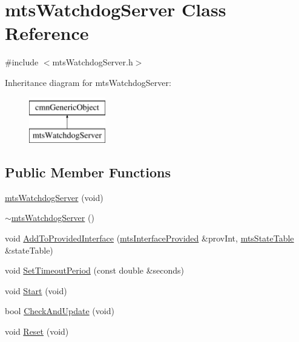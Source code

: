 \hypertarget{classmts_watchdog_server}{}\section{mts\+Watchdog\+Server Class Reference}
\label{classmts_watchdog_server}


{\ttfamily \#include $<$mts\+Watchdog\+Server.\+h$>$}

Inheritance diagram for mts\+Watchdog\+Server\+:\begin{figure}[H]
\begin{center}
\leavevmode
\includegraphics[height=2.000000cm]{d8/d6b/classmts_watchdog_server}
\end{center}
\end{figure}
\subsection*{Public Member Functions}
\begin{DoxyCompactItemize}
\item 
\hyperlink{classmts_watchdog_server_a9bc1b697c5232ce27b23e0b95d13dd87}{mts\+Watchdog\+Server} (void)
\item 
\hyperlink{classmts_watchdog_server_a194412bb759ee19f6b6f62d225cc3aa8}{$\sim$mts\+Watchdog\+Server} ()
\item 
void \hyperlink{classmts_watchdog_server_a46c5ade74f1d78e88eb30bc701a71d51}{Add\+To\+Provided\+Interface} (\hyperlink{classmts_interface_provided}{mts\+Interface\+Provided} \&prov\+Int, \hyperlink{classmts_state_table}{mts\+State\+Table} \&state\+Table)
\item 
void \hyperlink{classmts_watchdog_server_a4b7c34c079cdd8f7c5a934deb201f19c}{Set\+Timeout\+Period} (const double \&seconds)
\item 
void \hyperlink{classmts_watchdog_server_a8d94906b47c0f6cdd0bb6bf96f7dac3d}{Start} (void)
\item 
bool \hyperlink{classmts_watchdog_server_a45a726d4c07743456fc860a91394e24d}{Check\+And\+Update} (void)
\item 
void \hyperlink{classmts_watchdog_server_a74fd0e35e3ffc32273fb705420634266}{Reset} (void)
\end{DoxyCompactItemize}
